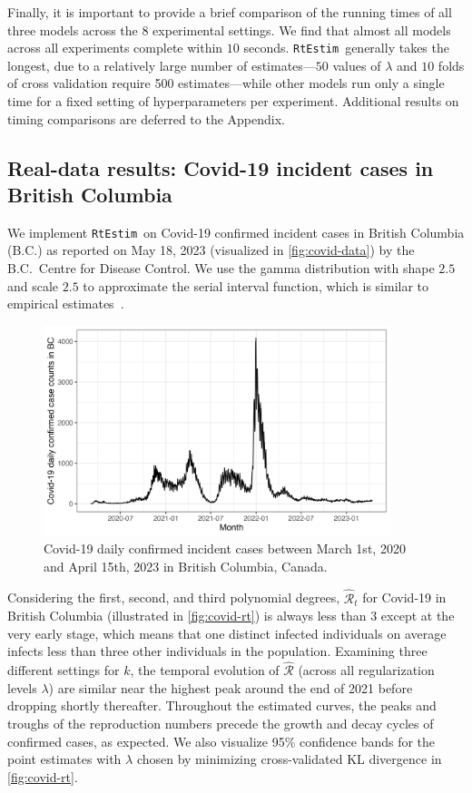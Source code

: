 \documentclass[10pt,letterpaper]{article}
\def\RtEstim{\texttt{RtEstim}}
\def\calR{\mathcal{R}}
\newcommand{\citep}[1]{\cite{#1}}
\begin{document}
Finally, it is important to provide a brief comparison of the running times of
all three models across the $8$ experimental settings. We find that almost all
models across all experiments complete within $10$ seconds. \RtEstim\ generally
takes the longest, due to a relatively large number of estimates---$50$ values
of $\lambda$ and $10$ folds of cross validation require 500 estimates---while
other models run only a single time for a fixed setting of hyperparameters per
experiment. Additional results on timing comparisons are deferred to the
Appendix. 


\subsection{Real-data results: Covid-19 incident cases in British Columbia}

We implement \RtEstim\ on Covid-19 confirmed incident cases in British Columbia
(B.C.) as reported on May 18, 2023 (visualized in \autoref{fig:covid-data}) by
the B.C.\ Centre for Disease Control. We use the gamma distribution with shape
$2.5$ and scale $2.5$ to approximate the serial interval function, which is
similar to empirical estimates~\citep{lehtinen2021relationship}. 

\begin{figure}[!h]
  \centering
  \includegraphics[width=0.9\textwidth]{fig/covid_dat.png}
  \caption{Covid-19 daily confirmed incident cases between March 1st, 
  2020 and April 15th, 2023 in British Columbia, Canada.} 
  \label{fig:covid-data}
\end{figure} 

Considering the first, second, and third polynomial degrees, $\widehat{\calR}_t$
for Covid-19 in British Columbia (illustrated in \autoref{fig:covid-rt}) is
always less than $3$ except at the very early stage, which means that one
distinct infected individuals on average infects less than three other
individuals in the population. Examining three different settings for $k$, the
temporal evolution of $\widehat{\calR}$ (across all regularization levels
$\lambda$) are similar near the highest peak around the end of 2021 before
dropping shortly thereafter. Throughout the estimated curves, the peaks and
troughs of the reproduction numbers precede the growth and decay cycles of
confirmed cases, as expected. We also visualize 95\% confidence bands for the
point estimates with $\lambda$ chosen by minimizing cross-validated KL
divergence in \autoref{fig:covid-rt}.     
\end{document}
